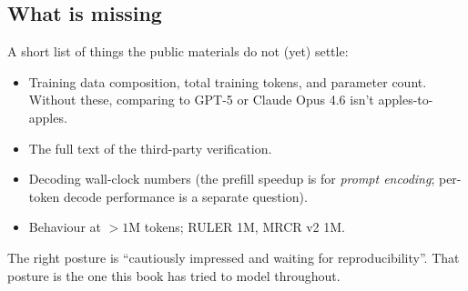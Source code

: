 
\subsection{What is missing}

A short list of things the public materials do not (yet) settle:

\begin{itemize}
\item Training data composition, total training tokens, and parameter
count. Without these, comparing to GPT-5 or Claude Opus 4.6 isn't
apples-to-apples.
\item The full text of the third-party verification.
\item Decoding wall-clock numbers (the prefill speedup is for
\emph{prompt encoding}; per-token decode performance is a separate
question).
\item Behaviour at $> 1$M tokens; RULER \@ 1M, MRCR v2 \@ 1M.
\end{itemize}

The right posture is ``cautiously impressed and waiting for
reproducibility''. That posture is the one this book has tried to model
throughout.
